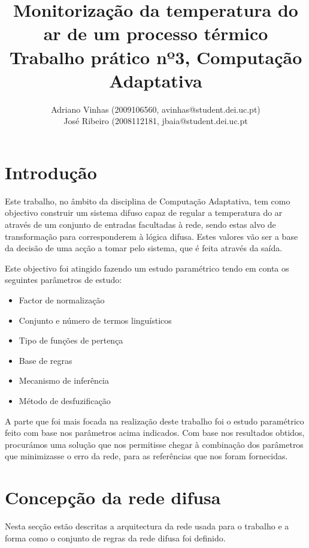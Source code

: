 \documentclass{article}
\begin{document}
\title{Monitorização da temperatura do ar de um processo térmico \\ Trabalho prático nº3, Computação Adaptativa}
\author{Adriano Vinhas (2009106560, avinhas@student.dei.uc.pt)\\
		José Ribeiro (2008112181, jbaia@student.dei.uc.pt}
\maketitle
\clearpage

\section{Introdução}

\indent \indent Este trabalho, no âmbito da disciplina de Computação Adaptativa, tem como objectivo construir um sistema difuso capaz de regular a temperatura do ar através de um conjunto de entradas facultadas à rede, sendo estas alvo de transformação para corresponderem à lógica difusa. Estes valores vão ser a base da decisão de uma acção a tomar pelo sistema, que é feita através da saída.

Este objectivo foi atingido fazendo um estudo paramétrico tendo em conta os seguintes parâmetros de estudo:
\begin{itemize}
\item Factor de normalização
\item Conjunto e número de termos linguísticos
\item Tipo de funções de pertença
\item Base de regras
\item Mecanismo de inferência
\item Método de desfuzificação
\end{itemize}

A parte que foi mais focada na realização deste trabalho foi o estudo paramétrico feito com base nos parâmetros acima indicados. Com base nos resultados obtidos, procurámos uma solução que nos permitisse chegar à combinação dos parâmetros que minimizasse o erro da rede, para as referências que nos foram fornecidas.

\clearpage
\section{Concepção da rede difusa}
\indent \indent Nesta secção estão descritas a arquitectura da rede usada para o trabalho e a forma como o conjunto de regras da rede difusa foi definido.
\end{document}
